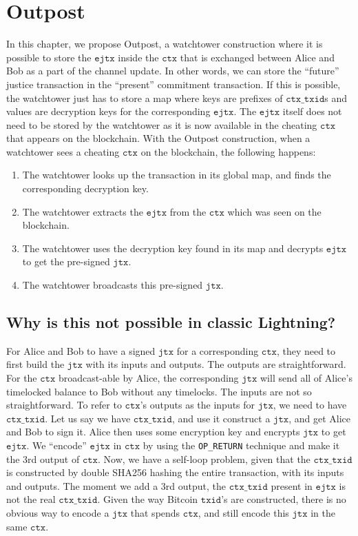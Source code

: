 \section{Outpost} %
In this chapter, we propose Outpost, a watchtower construction where it is possible to store the $\texttt{ejtx}$ inside the $\texttt{ctx}$ that is exchanged between Alice and Bob as a part of the channel update. In other words, we can store the ``future'' justice transaction in the ``present'' commitment transaction. If this is possible, the watchtower just has to store a map where keys are prefixes of $\texttt{ctx\_txid}$s and values are decryption keys for the corresponding $\texttt{ejtx}$. The $\texttt{ejtx}$ itself does not need to be stored by the watchtower as it is now available in the cheating $\texttt{ctx}$ that appears on the blockchain. With the Outpost construction, when a watchtower sees a cheating $\texttt{ctx}$ on the blockchain, the following happens:
\begin{enumerate}
\item The watchtower looks up the transaction in its global map, and finds the corresponding decryption key.
\item The watchtower extracts the $\texttt{ejtx}$ from the $\texttt{ctx}$ which was seen on the blockchain.
\item The watchtower uses the decryption key found in its map and decrypts $\texttt{ejtx}$ to get the pre-signed $\texttt{jtx}$.
\item The watchtower broadcasts this pre-signed $\texttt{jtx}$.
\end{enumerate}

\subsection{Why is this not possible in classic Lightning?}

For Alice and Bob to have a signed $\texttt{jtx}$ for a corresponding $\texttt{ctx}$, they need to first build the $\texttt{jtx}$ with its inputs and outputs. The outputs are straightforward. For the $\texttt{ctx}$ broadcast-able by Alice, the corresponding $\texttt{jtx}$ will send all of Alice's timelocked balance to Bob without any timelocks. The inputs are not so straightforward. To refer to $\texttt{ctx}$'s outputs as the inputs for $\texttt{jtx}$, we need to have $\texttt{ctx\_txid}$. Let us say we have $\texttt{ctx\_txid}$, and use it construct a $\texttt{jtx}$, and get Alice and Bob to sign it. Alice then uses some encryption key and encrypts $\texttt{jtx}$ to get $\texttt{ejtx}$. We ``encode'' $\texttt{ejtx}$ in $\texttt{ctx}$ by using the \texttt{OP\_RETURN} technique and make it the 3rd output of $\texttt{ctx}$. Now, we have a self-loop problem, given that the $\texttt{ctx\_txid}$ is constructed by double SHA256 hashing the entire transaction, with its inputs and outputs. The moment we add a 3rd output, the $\texttt{ctx\_txid}$ present in $\texttt{ejtx}$ is not the real $\texttt{ctx\_txid}$. Given the way Bitcoin $\texttt{txid}$'s are constructed, there is no obvious way to encode a $\texttt{jtx}$ that spends $\texttt{ctx}$, and still encode this $\texttt{jtx}$ in the same $\texttt{ctx}$.

